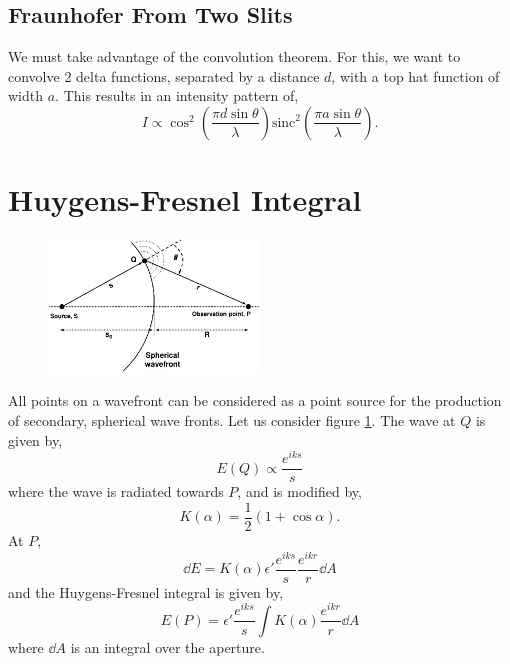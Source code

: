 \documentclass{book}
\begin{document}
{\subsection{Fraunhofer From Two Slits}
We must take advantage of the convolution theorem. For this, we want to convolve 2 delta functions, separated by a distance $d$, with a top hat function of width $a$. This results in an intensity pattern of,
\begin{equation}
	I \propto \cos^2\left(\frac{\pi d \sin\theta}{\lambda}\right)\text{sinc}^2\left(\frac{\pi a \sin\theta}{\lambda}\right).
\end{equation}
\section{Huygens-Fresnel Integral}
\begin{figure}[h]
	\centering
	\includegraphics[width=0.5\textwidth]{huygens.jpg}
	\caption{}
	\label{fig:huygens}
\end{figure}\noindent
All points on a wavefront can be considered as a point source for the production of secondary, spherical wave fronts. Let us consider figure \ref{fig:huygens}. The wave at $Q$ is given by,
\begin{equation}
	E(Q) \propto \frac{e^{iks}}{s}
\end{equation}
where the wave is radiated towards $P$, and is modified by,
\begin{equation}
	K(\alpha) = \frac{1}{2}\left(1 + \cos\alpha\right).
\end{equation}
At $P$, 
\begin{equation}
	\dd{E} = K(\alpha) \epsilon'\frac{e^{iks}}{s}\frac{e^{ikr}}{r}\dd{A}
\end{equation}
and the Huygens-Fresnel integral is given by,
\begin{equation}
	\boxed{E(P) = \epsilon'\frac{e^{iks}}{s}\int K(\alpha) \frac{e^{ikr}}{r}\dd{A}}
\end{equation}
where $\dd{A}$ is an integral over the aperture.
}
\end{document}
